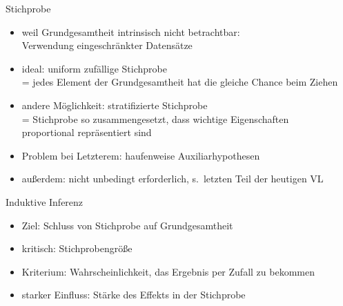 \begin{frame}
  {Stichprobe}
  \begin{itemize}[<+->]
    \item weil Grundgesamtheit intrinsisch nicht betrachtbar:\\
      \alert{Verwendung eingeschränkter Datensätze}
    \item ideal: \alert{uniform zufällige Stichprobe}\\
      = jedes Element der Grundgesamtheit hat die gleiche Chance beim Ziehen\\
    \item andere Möglichkeit: \alert{stratifizierte Stichprobe}\\
      = Stichprobe so zusammengesetzt, dass wichtige Eigenschaften\\
      proportional repräsentiert sind
    \item Problem bei Letzterem: haufenweise Auxiliarhypothesen
    \item außerdem: nicht unbedingt erforderlich, s.\ letzten Teil der heutigen VL
  \end{itemize}
\end{frame}

\begin{frame}
  {Induktive Inferenz}
  \begin{itemize}[<+->]
    \item Ziel: Schluss von Stichprobe auf Grundgesamtheit
    \item kritisch: Stichprobengröße
    \item Kriterium: Wahrscheinlichkeit, das Ergebnis per Zufall zu bekommen
    \item starker Einfluss: Stärke des Effekts in der Stichprobe
  \end{itemize}
\end{frame}

